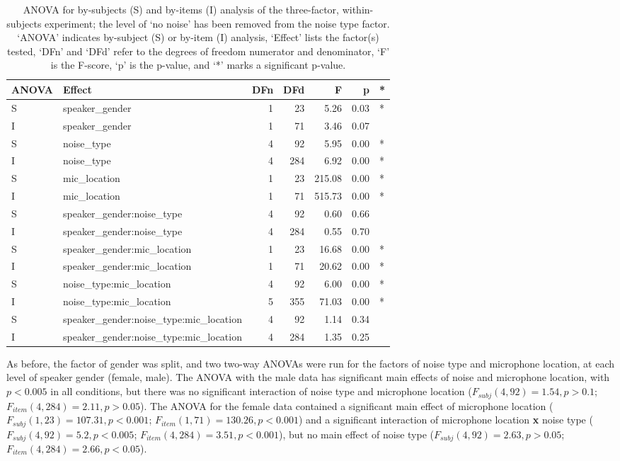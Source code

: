\begin{table}[ht]
\centering
\begin{tabular}{llrrrrl}
  \hline
ANOVA & Effect & DFn & DFd & F & p & * \\ 
  \hline
S & speaker\_gender & 1 & 23 & 5.26 & 0.03 & * \\ 
  I & speaker\_gender & 1 & 71 & 3.46 & 0.07 &  \\ 
  S & noise\_type & 4 & 92 & 5.95 & 0.00 & * \\ 
  I & noise\_type & 4 & 284 & 6.92 & 0.00 & * \\ 
  S & mic\_location & 1 & 23 & 215.08 & 0.00 & * \\ 
  I & mic\_location & 1 & 71 & 515.73 & 0.00 & * \\ 
  S & speaker\_gender:noise\_type & 4 & 92 & 0.60 & 0.66 &  \\ 
  I & speaker\_gender:noise\_type & 4 & 284 & 0.55 & 0.70 &  \\ 
  S & speaker\_gender:mic\_location & 1 & 23 & 16.68 & 0.00 & * \\ 
  I & speaker\_gender:mic\_location & 1 & 71 & 20.62 & 0.00 & * \\ 
  S & noise\_type:mic\_location & 4 & 92 & 6.00 & 0.00 & * \\ 
  I & noise\_type:mic\_location & 5 & 355 & 71.03 & 0.00 & * \\ 
  S & speaker\_gender:noise\_type:mic\_location & 4 & 92 & 1.14 & 0.34 &  \\ 
  I & speaker\_gender:noise\_type:mic\_location & 4 & 284 & 1.35 & 0.25 &  \\ 
   \hline
\end{tabular}
\caption{ANOVA for by-subjects (S) and by-items (I) analysis of the three-factor, within-subjects experiment; the level of `no noise' has been removed from the noise type factor. `ANOVA' indicates by-subject (S) or by-item (I) analysis, `Effect' lists the factor(s) tested, `DFn' and `DFd' refer to the degrees of freedom numerator and denominator, `F' is the F-score, `p' is the p-value, and `*' marks a significant p-value.} 
\label{tab:anova2}
\end{table}


As before, the factor of gender was split, and two two-way ANOVAs were run for the factors of noise type and microphone location, at each level of speaker gender (female, male).  The ANOVA with the male data has significant main effects of noise and microphone location, with $p<0.005$ in all conditions, but there was no significant interaction of noise type and microphone location ($F_{subj}(4,92)=1.54, p>0.1$; $F_{item}(4,284)=2.11, p>0.05$).  The ANOVA for the female data contained a significant main effect of microphone location ($F_{subj}(1,23)=107.31, p<0.001$; $F_{item}(1,71)=130.26, p<0.001$) and a significant interaction of microphone location \textbf{x} noise type ($F_{subj}(4,92)=5.2, p<0.005$; $F_{item}(4,284)=3.51, p<0.001$), but no main effect of noise type ($F_{subj}(4,92)=2.63, p>0.05$; $F_{item}(4,284)=2.66, p<0.05$).

